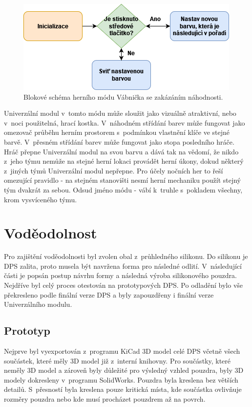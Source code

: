 \begin{figure}[!h]
  \begin{center}
    \includegraphics[scale=0.75]{obrazky/Vabnicka_diagram.png}
  \end{center}
  \caption[Blokové schéma herního módu Vábnička se zakázáním náhodnosti]{Blokové schéma herního módu Vábnička se zakázáním náhodnosti.}
\end{figure}

Univerzální modul v~tomto módu může sloužit jako vizuálně atraktivní, nebo v~noci použitelná, hrací kostka. V~náhodném střídání barev může fungovat jako omezovač průběhu herním prostorem s~podmínkou 
vlastnění klíče ve stejné barvě. V~přesném střídání barev může fungovat jako stopa posledního hráče. Hráč přepne Univerzální modul na svou barvu a dává tak na vědomí, že nikdo z~jeho týmu nemůže na 
stejné herní lokaci provádět herní úkony, dokud některý z~jiných týmů Univerzální modul nepřepne. Pro účely nočních her to řeší omezující pravidlo - na stejném stanovišti nesmí herní mechaniku použít 
stejný tým dvakrát za sebou. Odsud jméno módu - vábí k~truhle s~pokladem všechny, krom vysvíceného týmu.

\chapter{Voděodolnost}
Pro zajištění voděodolnosti byl zvolen obal z~průhledného silikonu. Do silikonu je DPS zalita, proto musela být navržena forma pro následné odlití. V~následující části je popsán postup 
návrhu formy a následná výroba silikonového pouzdra. Nejdříve byl celý proces otestován na prototypových DPS. Po odladění bylo vše překresleno podle finální verze DPS a byly zapouzdřeny
i finální verze Univerzálního modulu.  

\section{Prototyp}
Nejprve byl vyexportován z~programu KiCad 3D model celé DPS včetně všech součástek, které měly 3D model již z~interní knihovny. Pro součástky, které neměly 3D model a zároveň byly důležité 
pro výsledný vzhled pouzdra, byly 3D modely dokresleny v~programu SolidWorks. Pouzdra byla kreslena bez větších detailů. S~přesností byla kreslena pouze kritická místa, kde součástka ovlivňuje 
rozměry pouzdra nebo kde musí procházet pouzdrem až na povrch.
  
